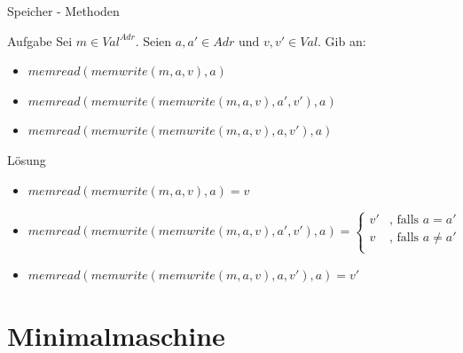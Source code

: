 
\begin{frame}{Speicher - Methoden}
	\begin{exampleblock}{Aufgabe}		
		Sei $m \in Val^{Adr}$. Seien $ a,a' \in Adr \text{ und } v,v' \in Val$. Gib an: \\
		\begin{itemize}
			\item $memread(memwrite(m,a,v),a)$
			\item $memread(memwrite(memwrite(m,a,v),a',v'),a)$
			\item $memread(memwrite(memwrite(m,a,v),a,v'),a)$
		\end{itemize}
	\end{exampleblock}
	\pause
	\begin{block}{Lösung}
	\small
		\begin{itemize}
			\item $memread(memwrite(m,a,v),a) = v$
			\item $memread(memwrite(memwrite(m,a,v),a',v'),a) = \begin{cases}
																	v' & \text{, falls } a = a' \\
																	v  & \text{, falls } a \neq a' \\
																\end{cases}$
			\item $memread(memwrite(memwrite(m,a,v),a,v'),a) = v' $
		\end{itemize}
	\end{block}
\end{frame}

\section[MIMA]{Minimalmaschine}
